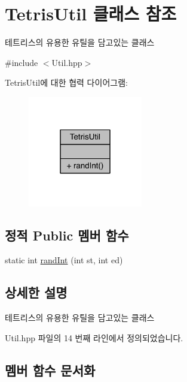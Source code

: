 \hypertarget{class_tetris_util}{}\section{Tetris\+Util 클래스 참조}
\label{class_tetris_util}


테트리스의 유용한 유틸을 담고있는 클래스  




{\ttfamily \#include $<$Util.\+hpp$>$}



Tetris\+Util에 대한 협력 다이어그램\+:
\nopagebreak
\begin{figure}[H]
\begin{center}
\leavevmode
\includegraphics[width=142pt]{class_tetris_util__coll__graph}
\end{center}
\end{figure}
\subsection*{정적 Public 멤버 함수}
\begin{DoxyCompactItemize}
\item 
static int \hyperlink{class_tetris_util_a0a60e809425ddb416a500bcc03cf7061}{rand\+Int} (int st, int ed)
\end{DoxyCompactItemize}


\subsection{상세한 설명}
테트리스의 유용한 유틸을 담고있는 클래스 

Util.\+hpp 파일의 14 번째 라인에서 정의되었습니다.



\subsection{멤버 함수 문서화}
\mbox{\label{class_tetris_util_a0a60e809425ddb416a500bcc03cf7061}} 
